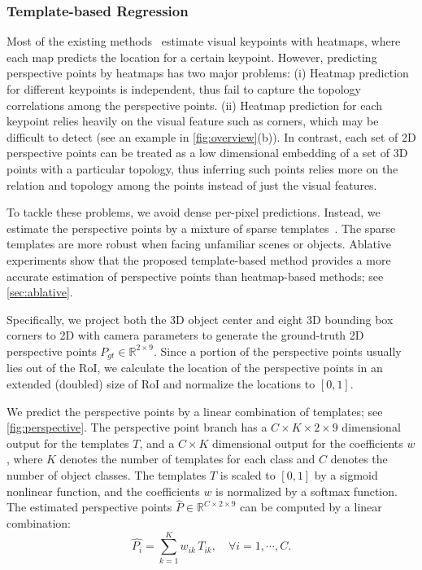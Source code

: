 \documentclass{article}
\begin{document}
\subsubsection{Template-based Regression}

Most of the existing methods~\cite{newell2016stacked,lee2017roomnet,zou2018layoutnet,he2017mask,suwajanakorn2018discovery} estimate visual keypoints with heatmaps, where each map predicts the location for a certain keypoint. However, predicting perspective points by heatmaps has two major problems: (i) Heatmap prediction for different keypoints is independent, thus fail to capture the topology correlations among the perspective points. (ii) Heatmap prediction for each keypoint relies heavily on the visual feature such as corners, which may be difficult to detect (see an example in \autoref{fig:overview}(b)). In contrast, each set of 2D perspective points can be treated as a low dimensional embedding of a set of 3D points with a particular topology, thus inferring such points relies more on the relation and topology among the points instead of just the visual features.

To tackle these problems, we avoid dense per-pixel predictions. Instead, we estimate the perspective points by a mixture of sparse templates~\cite{olshausen1996emergence,wu2010learning}. The sparse templates are more robust when facing unfamiliar scenes or objects. Ablative experiments show that the proposed template-based method provides a more accurate estimation of perspective points than heatmap-based methods; see \autoref{sec:ablative}.

Specifically, we project both the 3D object center and eight 3D bounding box corners to 2D with camera parameters to generate the ground-truth 2D perspective points $P_{gt} \in \mathbb{R}^{2 \times 9}$. Since a portion of the perspective points usually lies out of the RoI, we calculate the location of the perspective points in an extended (doubled) size of RoI and normalize the locations to $[0, 1]$.

We predict the perspective points by a linear combination of templates; see \autoref{fig:perspective}. The perspective point branch has a $C \times K \times 2 \times 9$ dimensional output for the templates $T$, and a $C \times K$ dimensional output for the coefficients $w$, where $K$ denotes the number of templates for each class and $C$ denotes the number of object classes. The templates $T$ is scaled to $[0, 1]$ by a sigmoid nonlinear function, and the coefficients $w$ is normalized by a softmax function. The estimated perspective points $\hat{P} \in \mathbb{R}^{C \times 2 \times 9}$ can be computed by a linear combination: 
\begin{equation}
    \hat{P_i} = \sum^{K}_{k=1} w_{ik}\,T_{ik}, \quad{} \forall i = 1, \cdots, C.
\end{equation}
\end{document}
